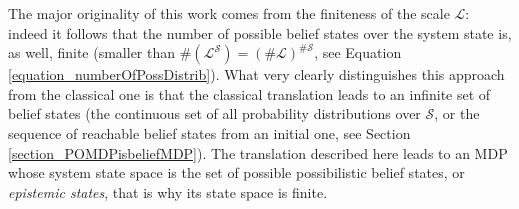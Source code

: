 
The major originality of this work comes from the finiteness of the scale $\mathcal{L}$:
indeed it follows that the number of possible belief states over the system state 
is, as well, finite (smaller than $\# ( \mathcal{L}^{\mathcal{S}} ) = 
(\# \mathcal{L})^{\# \mathcal{S}}$, see Equation \ref{equation_numberOfPossDistrib}). 
What very clearly distinguishes this approach
from the classical one is that the classical translation leads to an infinite set of 
belief states (the continuous set of all probability distributions over $\mathcal{S}$, 
or the sequence of reachable belief states from an initial one, see Section \ref{section_POMDPisbeliefMDP}).
The translation described here leads to an MDP whose system state space
is the set of possible possibilistic belief states, or \textit{epistemic states},
that is why its state space is finite. 

